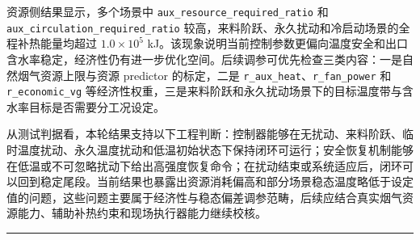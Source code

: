 \documentclass[UTF8,openany,zihao=-4,oneside]{ctexbook}
\providecommand{\passthrough}[1]{#1}
\newcommand{\manualdivider}{\par\vspace{0.6em}\noindent\textcolor{FGLine}{\rule{\linewidth}{0.7pt}}\vspace{0.6em}\par}
\begin{document}
资源侧结果显示，多个场景中 \passthrough{\lstinline!aux_resource_required_ratio!} 和 \passthrough{\lstinline!aux_circulation_required_ratio!} 较高，来料阶跃、永久扰动和冷启动场景的全程补热能量均超过 $1.0\times10^5$ kJ。该现象说明当前控制参数更偏向温度安全和出口含水率稳定，经济性仍有进一步优化空间。后续调参可优先检查三类内容：一是自然烟气资源上限与资源 predictor 的标定，二是 \passthrough{\lstinline!r_aux_heat!}、\passthrough{\lstinline!r_fan_power!} 和 \passthrough{\lstinline!r_economic_vg!} 等经济性权重，三是来料阶跃和永久扰动场景下的目标温度带与含水率目标是否需要分工况设定。

从测试判据看，本轮结果支持以下工程判断：控制器能够在无扰动、来料阶跃、临时温度扰动、永久温度扰动和低温初始状态下保持闭环可运行；安全恢复机制能够在低温或不可忽略扰动下给出高强度恢复命令；在扰动结束或系统适应后，闭环可以回到稳定尾段。当前结果也暴露出资源消耗偏高和部分场景稳态温度略低于设定值的问题，这些问题主要属于经济性与稳态偏差调参范畴，后续应结合真实烟气资源能力、辅助补热约束和现场执行器能力继续校核。

\manualdivider
\end{document}
